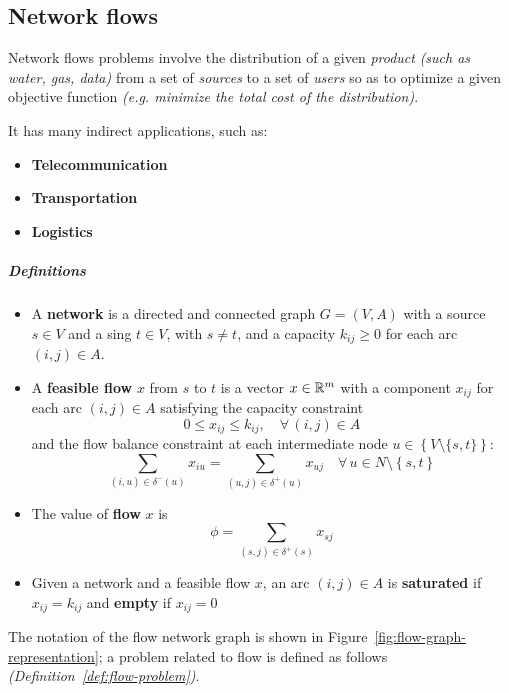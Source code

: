 \documentclass[english]{article}
\begin{document}
\subsection{Network flows}

Network flows problems involve the distribution of a given \textit{product} \textit{(such as water, gas, data)} from a set of \textit{sources} to a set of \textit{users} so as to optimize a given objective function \textit{(e.g. minimize the total cost of the distribution)}.

It has many indirect applications, such as:

\begin{itemize}
  \item \textbf{Telecommunication}
  \item \textbf{Transportation}
  \item \textbf{Logistics}
\end{itemize}

\subparagraph*{Definitions
}
\begin{itemize}
  \item A \textbf{network} is a directed and connected graph \(G = (V, A)\) with a source \(s \in V\) and a sing \(t \in V\), with \(s \neq t\), and a capacity \(k_{ij} \geq 0\) for each arc \((i, j) \in A\).
  \item A \textbf{feasible flow} \(x\) from \(s\) to \(t\) is a vector \(x \in \mathbb{R}^m\) with a component \(x_{ij}\) for each arc \((i, j) \in A\) satisfying the capacity constraint \[0 \leq x_{ij} \leq k_{ij}, \quad \forall \, \left( i, j \right) \in A\]
        and the flow balance constraint at each intermediate node \(u \in \left\{ V \setminus \{s, t\} \right\}\):
        \[\displaystyle \sum_{\left( i, u \right) \in \delta^{-}(u)} x_{iu} = \displaystyle \sum_{\left( u, j \right) \in \delta^{+}(u)} x_{uj} \quad \forall \, u \in N \setminus \left\{ s, t \right\} \]
  \item The value of \textbf{flow} \(x\) is
        \[\phi = \displaystyle \sum_{\left( s, j \right) \in \delta^{+}(s)} x_{sj}\]
  \item Given a network and a feasible flow \(x\), an arc \(\left( i, j \right) \in A\) is \textbf{saturated} if \(x_{ij} = k_{ij}\) and \textbf{empty} if \(x_{ij} = 0\)
\end{itemize}

The notation of the flow network graph is shown in Figure~\ref{fig:flow-graph-representation};
a problem related to flow is defined as follows \textit{(Definition~\ref{def:flow-problem})}.
\end{document}
